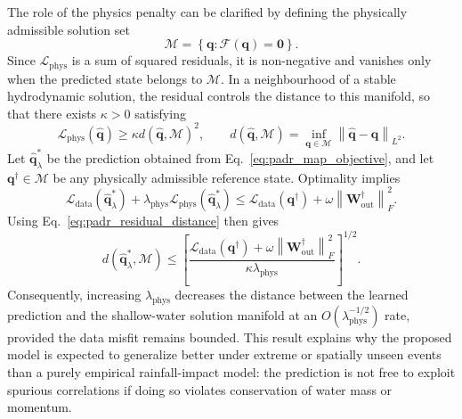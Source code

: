 \documentclass[pdflatex,sn-mathphys-ay]{sn-jnl}
\theoremstyle{thmstyleone}
\theoremstyle{thmstylethree}
\theoremstyle{thmstyletwo}
\begin{document}
The role of the physics penalty can be clarified by defining the
physically admissible solution set
\begin{equation}
  \mathcal{M}
  =
  \left\{
    \mathbf{q}:
    \mathcal{F}
    \left(
      \mathbf{q}
    \right)
    =
    \mathbf{0}
  \right\}.
  \label{eq:padr_physical_manifold}
\end{equation}
Since $\mathcal{L}_{\mathrm{phys}}$ is a sum of squared residuals, it
is non-negative and vanishes only when the predicted state belongs to
$\mathcal{M}$.  In a neighbourhood of a stable hydrodynamic solution,
the residual controls the distance to this manifold, so that there
exists $\kappa>0$ satisfying
\begin{equation}
  \mathcal{L}_{\mathrm{phys}}
  \left(
    \hat{\mathbf{q}}
  \right)
  \geq
  \kappa
  d
  \left(
    \hat{\mathbf{q}},
    \mathcal{M}
  \right)^{2},
  \qquad
  d
  \left(
    \hat{\mathbf{q}},
    \mathcal{M}
  \right)
  =
  \inf_{\mathbf{q}\in\mathcal{M}}
  \left\|
    \hat{\mathbf{q}}
    -
    \mathbf{q}
  \right\|_{L^{2}}.
  \label{eq:padr_residual_distance}
\end{equation}
Let $\hat{\mathbf{q}}^{*}_{\lambda}$ be the prediction obtained from
Eq.~\eqref{eq:padr_map_objective}, and let
$\mathbf{q}^{\dagger}\in\mathcal{M}$ be any physically admissible
reference state.  Optimality implies
\begin{equation}
  \mathcal{L}_{\mathrm{data}}
  \left(
    \hat{\mathbf{q}}^{*}_{\lambda}
  \right)
  +
  \lambda_{\mathrm{phys}}
  \mathcal{L}_{\mathrm{phys}}
  \left(
    \hat{\mathbf{q}}^{*}_{\lambda}
  \right)
  \leq
  \mathcal{L}_{\mathrm{data}}
  \left(
    \mathbf{q}^{\dagger}
  \right)
  +
  \omega
  \left\|
    \mathbf{W}^{\dagger}_{\mathrm{out}}
  \right\|_{F}^{2}.
  \label{eq:padr_optimality_bound}
\end{equation}
Using Eq.~\eqref{eq:padr_residual_distance} then gives
\begin{equation}
  d
  \left(
    \hat{\mathbf{q}}^{*}_{\lambda},
    \mathcal{M}
  \right)
  \leq
  \left[
  \frac{
    \mathcal{L}_{\mathrm{data}}
    \left(
      \mathbf{q}^{\dagger}
    \right)
    +
    \omega
    \left\|
      \mathbf{W}^{\dagger}_{\mathrm{out}}
    \right\|_{F}^{2}
  }{
    \kappa
    \lambda_{\mathrm{phys}}
  }
  \right]^{1/2}.
  \label{eq:padr_distance_rate}
\end{equation}
Consequently, increasing $\lambda_{\mathrm{phys}}$ decreases the
distance between the learned prediction and the shallow-water solution
manifold at an $O(\lambda_{\mathrm{phys}}^{-1/2})$ rate, provided the
data misfit remains bounded.  This result explains why the proposed
model is expected to generalize better under extreme or spatially
unseen events than a purely empirical rainfall-impact model: the
prediction is not free to exploit spurious correlations if doing so
violates conservation of water mass or momentum.
\end{document}
